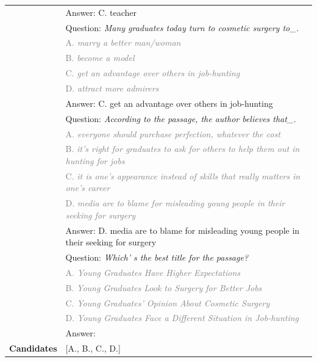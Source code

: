 \documentclass{article}
\begin{document}
\begin{table}[h]
\begin{tabular}{lp{11.5cm}}
& Answer: C. teacher\\
& Question: \emph{Many graduates today turn to cosmetic surgery to\_.} \\
& \textcolor{gray}{A. \emph{marry a better man/woman}} \\
& \textcolor{gray}{B. \emph{become a model}} \\
& \textcolor{gray}{C. \emph{get an advantage over others in job-hunting}} \\
& \textcolor{gray}{D. \emph{attract more admirers}} \\
& Answer: C. get an advantage over others in job-hunting\\
& Question: \emph{According to the passage, the author believes that\_.} \\
& \textcolor{gray}{A. \emph{everyone should purchase perfection, whatever the cost}} \\
& \textcolor{gray}{B. \emph{it's right for graduates to ask for others to help them out in hunting for jobs}} \\
& \textcolor{gray}{C. \emph{it is one's appearance instead of skills that really matters in one's career}} \\
& \textcolor{gray}{D. \emph{media are to blame for misleading young people in their seeking for surgery}} \\
& Answer: D. media are to blame for misleading young people in their seeking for surgery\\
& Question: \emph{Which' s the best title for the passage?} \\
& \textcolor{gray}{A. \emph{Young Graduates Have Higher Expectations}} \\
& \textcolor{gray}{B. \emph{Young Graduates Look to Surgery for Better Jobs}} \\
& \textcolor{gray}{C. \emph{Young Graduates' Opinion About Cosmetic Surgery}} \\
& \textcolor{gray}{D. \emph{Young Graduates Face a Different Situation in Job-hunting}} \\
& Answer:\\
\textbf{Candidates}   & {[}A., B., C., D.{]}         \\                                                 \bottomrule                                                                                                         
\end{tabular}
\end{table}
\end{document}
